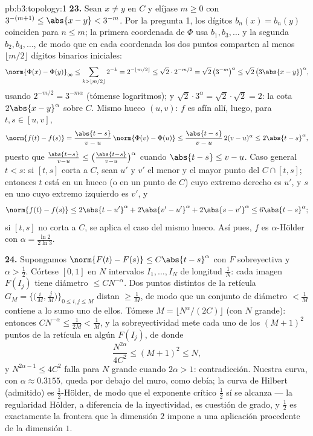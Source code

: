 \begin{solution}{pb:b3:topology:1}
\textbf{23.} Sean $x \neq y$ en $C$ y elíjase $m \geq 0$ con
$3^{-(m+1)} \leq \abs{x - y} < 3^{-m}$. Por la pregunta 1, los dígitos
$b_n(x) = b_n(y)$ coinciden para $n \leq m$; la primera coordenada de
$\Phi$ usa $b_1, b_3, \dots$ y la segunda $b_2,
b_4, \dots$, de modo que en cada coordenada los dos puntos comparten al
menos $\lfloor m/2\rfloor$ dígitos binarios iniciales:
\[
\norm{\Phi(x) - \Phi(y)}_\infty
\leq \sum_{k > \lfloor m/2\rfloor}2^{-k}
= 2^{-\lfloor m/2\rfloor} \leq \sqrt2\cdot2^{-m/2}
= \sqrt2\,\bigl(3^{-m}\bigr)^\alpha
\leq \sqrt2\,\bigl(3\abs{x-y}\bigr)^\alpha,
\]
usando $2^{-m/2} = 3^{-m\alpha}$ (tómense logaritmos); y
$\sqrt2\cdot3^\alpha = \sqrt2\cdot\sqrt2 = 2$: la cota
$2\abs{x-y}^\alpha$ sobre $C$. Mismo hueco $(u, v)$: $f$ es afín allí,
luego, para $t, s \in [u, v]$,
\[
\norm{f(t) - f(s)} = \frac{\abs{t-s}}{v-u}\,
\norm{\Phi(v) - \Phi(u)}
\leq \frac{\abs{t-s}}{v-u}\,2(v-u)^\alpha
\leq 2\abs{t-s}^\alpha,
\]
puesto que $\frac{\abs{t-s}}{v-u} \leq \bigl(\frac{\abs{t-s}}
{v-u}\bigr)^\alpha$ cuando $\abs{t-s} \leq v - u$. Caso general $t <
s$: si $[t, s]$ corta a $C$, sean $u'$ y $v'$ el menor y el mayor punto
del  $C \cap [t, s]$; entonces
$t$ está en un hueco (o en un punto de $C$) cuyo extremo derecho es
$u'$, y $s$ en uno cuyo extremo izquierdo es $v'$, y
\[
\norm{f(t) - f(s)} \leq 2\abs{t - u'}^\alpha
+ 2\abs{v' - u'}^\alpha + 2\abs{s - v'}^\alpha
\leq 6\abs{t - s}^\alpha ;
\]
si $[t, s]$ no corta a $C$, se aplica el caso del mismo hueco. Así pues,
$f$ es $\alpha$-Hölder con $\alpha = \frac{\ln2}{2\ln3}$.

\textbf{24.} Supongamos $\norm{F(t) - F(s)} \leq
C\abs{t-s}^\alpha$ con $F$ sobreyectiva y $\alpha >
\frac12$. Córtese $[0,1]$ en $N$ intervalos $I_1, \dots, I_N$ de
longitud $\frac1N$: cada imagen $F(I_j)$ tiene diámetro $\leq
CN^{-\alpha}$. Dos puntos distintos de la retícula $G_M =
\bigl\{\bigl(\frac iM, \frac jM\bigr)\bigr\}_{0 \leq i, j
\leq M}$ distan $\geq \frac1M$, de modo que un conjunto de diámetro
$< \frac1M$ contiene a lo sumo uno de ellos. Tómese $M =
\lfloor N^\alpha/(2C)\rfloor$ (con $N$ grande): entonces
$CN^{-\alpha} \leq \frac1{2M} < \frac1M$, y la sobreyectividad mete cada
uno de los $(M+1)^2$ puntos de la retícula en algún $F(I_j)$, de donde
\[
\frac{N^{2\alpha}}{4C^2} \leq (M + 1)^2 \leq N,
\]
y $N^{2\alpha - 1} \leq 4C^2$ falla para $N$ grande cuando
$2\alpha > 1$: contradicción. Nuestra curva, con $\alpha \approx
0.3155$, queda por debajo del muro, como debía; la curva de Hilbert
(admitido) es $\frac12$-Hölder, de modo que el exponente crítico
$\frac12$ sí se alcanza --- la regularidad Hölder, a diferencia de la
inyectividad, es cuestión de grado, y $\frac12$ es exactamente la
frontera que la dimensión $2$ impone a una aplicación procedente de la
dimensión $1$.


\end{solution}
